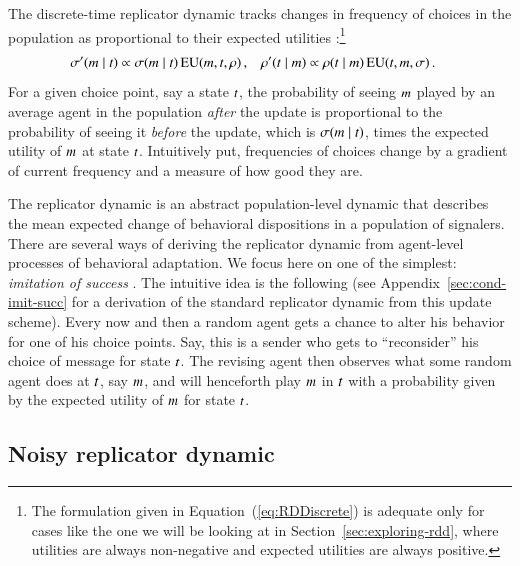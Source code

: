 \documentclass[fleqn,reqno,10pt]{article}
\begin{document}
The discrete-time replicator dynamic tracks changes in frequency of choices in the population
as proportional to their expected utilities
\citep[e.g.][]{HofbauerSigmund1998:Evolutionary-Ga}:\footnote{The formulation given in
  Equation~(\ref{eq:RDDiscrete}) is adequate only for cases like the one we will be looking at
  in Section~\ref{sec:exploring-rdd}, where utilities are always non-negative and expected
  utilities are always positive.}
\begin{align}
  \label{eq:RDDiscrete}
  \sigma'(m \mid t) & \propto \sigma(m \mid t) \thinspace
    \mathrm{EU}(m, t,\rho)\,, & \rho'(t \mid m) & \propto \rho(t \mid m) \thinspace
    \mathrm{EU}(t, m,\sigma)\,.   
\end{align}
For a given choice point, say a state $t$, the probability of seeing $m$ played by an
average agent in the population \emph{after} the update is proportional to the probability of
seeing it \emph{before} the update, which is $\sigma(m \mid t)$, times the
expected utility of $m$ at state $t$. Intuitively put, frequencies of choices change
by a gradient of current frequency and a measure of how good they are.

The replicator dynamic is an abstract population-level dynamic that describes the mean expected
change of behavioral dispositions in a population of signalers. There are several ways of
deriving the replicator dynamic from agent-level processes of behavioral adaptation. We focus
here on one of the simplest: \emph{imitation of success}
\citep[see][]{Sandholm2010:Population-Game}. The intuitive idea is the following (see
Appendix~\ref{sec:cond-imit-succ} for a derivation of the standard replicator dynamic from this
update scheme).  Every now and then a random agent gets a chance to alter his behavior for one
of his choice points. Say, this is a sender who gets to ``reconsider'' his choice of message
for state $t$. The revising agent then observes what some random agent does at $t$,
say $m$, and will henceforth play $m$ in $t$ with a probability given by the
expected utility of $m$ for state $t$.

\subsection{Noisy replicator dynamic}
\label{sec:noisy-repl-dynam}
\end{document}
